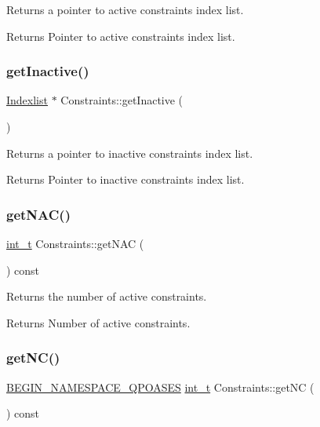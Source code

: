 Returns a pointer to active constraints index list. \begin{DoxyReturn}{Returns}
Pointer to active constraints index list. 
\end{DoxyReturn}
\mbox{\label{class_constraints_a38d7f83123a7a277fde92bf493776a72}} 
\subsubsection{\texorpdfstring{get\+Inactive()}{getInactive()}}
{\footnotesize\ttfamily \hyperlink{class_indexlist}{Indexlist} $\ast$ Constraints\+::get\+Inactive (\begin{DoxyParamCaption}{ }\end{DoxyParamCaption})\hspace{0.3cm}{\ttfamily [inline]}}

Returns a pointer to inactive constraints index list. \begin{DoxyReturn}{Returns}
Pointer to inactive constraints index list. 
\end{DoxyReturn}
\mbox{\label{class_constraints_a6a006b2ffc150038ef194172f097accf}} 
\subsubsection{\texorpdfstring{get\+N\+A\+C()}{getNAC()}}
{\footnotesize\ttfamily \hyperlink{_types_8hpp_ab6fd6105e64ed14a0c9281326f05e623}{int\+\_\+t} Constraints\+::get\+N\+AC (\begin{DoxyParamCaption}{ }\end{DoxyParamCaption}) const\hspace{0.3cm}{\ttfamily [inline]}}

Returns the number of active constraints. \begin{DoxyReturn}{Returns}
Number of active constraints. 
\end{DoxyReturn}
\mbox{\label{class_constraints_a448e9210dcbdc9a191914f4b7dc2759e}} 
\subsubsection{\texorpdfstring{get\+N\+C()}{getNC()}}
{\footnotesize\ttfamily \hyperlink{_types_8hpp_afd127fcb3c8f47975e9fa0ec2bacde52}{B\+E\+G\+I\+N\+\_\+\+N\+A\+M\+E\+S\+P\+A\+C\+E\+\_\+\+Q\+P\+O\+A\+S\+ES} \hyperlink{_types_8hpp_ab6fd6105e64ed14a0c9281326f05e623}{int\+\_\+t} Constraints\+::get\+NC (\begin{DoxyParamCaption}{ }\end{DoxyParamCaption}) const\hspace{0.3cm}{\ttfamily [inline]}}

